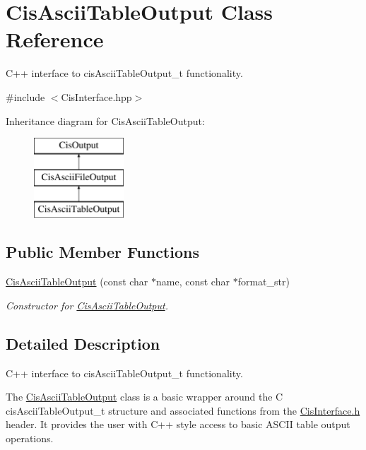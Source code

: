 \hypertarget{classCisAsciiTableOutput}{}\section{Cis\+Ascii\+Table\+Output Class Reference}
\label{classCisAsciiTableOutput}


C++ interface to cis\+Ascii\+Table\+Output\+\_\+t functionality.  




{\ttfamily \#include $<$Cis\+Interface.\+hpp$>$}

Inheritance diagram for Cis\+Ascii\+Table\+Output\+:\begin{figure}[H]
\begin{center}
\leavevmode
\includegraphics[height=3.000000cm]{classCisAsciiTableOutput}
\end{center}
\end{figure}
\subsection*{Public Member Functions}
\begin{DoxyCompactItemize}
\item 
\mbox{\hyperlink{classCisAsciiTableOutput_aa579418326a4192bf481e4e46fd3c170}{Cis\+Ascii\+Table\+Output}} (const char $\ast$name, const char $\ast$format\+\_\+str)
\begin{DoxyCompactList}\small\item\em Constructor for \mbox{\hyperlink{classCisAsciiTableOutput}{Cis\+Ascii\+Table\+Output}}. \end{DoxyCompactList}\end{DoxyCompactItemize}


\subsection{Detailed Description}
C++ interface to cis\+Ascii\+Table\+Output\+\_\+t functionality. 

The \mbox{\hyperlink{classCisAsciiTableOutput}{Cis\+Ascii\+Table\+Output}} class is a basic wrapper around the C cis\+Ascii\+Table\+Output\+\_\+t structure and associated functions from the \mbox{\hyperlink{CisInterface_8h_source}{Cis\+Interface.\+h}} header. It provides the user with C++ style access to basic A\+S\+C\+II table output operations. 

